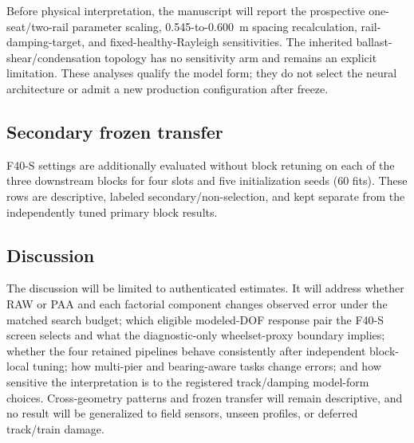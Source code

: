 Before physical interpretation, the manuscript will report the prospective
one-seat/two-rail parameter scaling, 0.545-to-0.600~m spacing recalculation,
rail-damping-target, and fixed-healthy-Rayleigh sensitivities. The inherited
ballast-shear/condensation topology has no sensitivity arm and remains an
explicit limitation. These analyses qualify the model form; they do not select
the neural architecture or admit a new production configuration after freeze.

\subsection{Secondary frozen transfer}
\label{sec:transfer_results}

F40-S settings are additionally evaluated without block retuning on each of
the three downstream blocks for four slots and five initialization seeds (60
fits). These rows are descriptive, labeled secondary/non-selection, and kept
separate from the independently tuned primary block results.

\subsection{Discussion}
\label{sec:discussion}

The discussion will be limited to authenticated estimates. It will address
whether RAW or PAA and each factorial component changes observed error under
the matched search budget; which eligible modeled-DOF response pair the F40-S
screen selects and what the diagnostic-only wheelset-proxy boundary implies;
whether the
four retained pipelines behave consistently after independent block-local
tuning; how multi-pier and bearing-aware tasks change errors; and how sensitive
the interpretation is to the registered track/damping model-form choices.
Cross-geometry patterns and frozen transfer will remain descriptive, and no
result will be generalized to field sensors, unseen profiles, or deferred
track/train damage.
